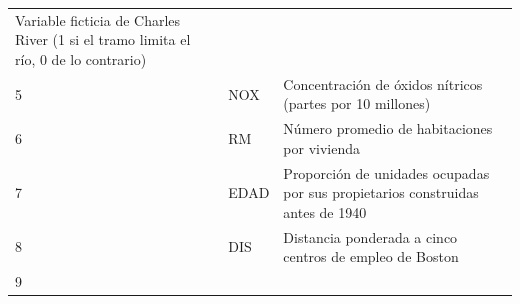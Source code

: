 \documentclass[11pt]{article}
\begin{document}
\begin{longtable}[]{@{}lll@{}}
\begin{minipage}[t]{0.20\columnwidth}
Variable ficticia de Charles River (1 si el tramo limita el río, 0 de lo
contrario)\strut
\end{minipage}\tabularnewline
\begin{minipage}[t]{0.08\columnwidth}\raggedright\strut
5\strut
\end{minipage} & \begin{minipage}[t]{0.14\columnwidth}\raggedright\strut
NOX\strut
\end{minipage} & \begin{minipage}[t]{0.20\columnwidth}\raggedright\strut
Concentración de óxidos nítricos (partes por 10 millones)\strut
\end{minipage}\tabularnewline
\begin{minipage}[t]{0.08\columnwidth}\raggedright\strut
6\strut
\end{minipage} & \begin{minipage}[t]{0.14\columnwidth}\raggedright\strut
RM\strut
\end{minipage} & \begin{minipage}[t]{0.20\columnwidth}\raggedright\strut
Número promedio de habitaciones por vivienda\strut
\end{minipage}\tabularnewline
\begin{minipage}[t]{0.08\columnwidth}\raggedright\strut
7\strut
\end{minipage} & \begin{minipage}[t]{0.14\columnwidth}\raggedright\strut
EDAD\strut
\end{minipage} & \begin{minipage}[t]{0.20\columnwidth}\raggedright\strut
Proporción de unidades ocupadas por sus propietarios construidas antes
de 1940\strut
\end{minipage}\tabularnewline
\begin{minipage}[t]{0.08\columnwidth}\raggedright\strut
8\strut
\end{minipage} & \begin{minipage}[t]{0.14\columnwidth}\raggedright\strut
DIS\strut
\end{minipage} & \begin{minipage}[t]{0.20\columnwidth}\raggedright\strut
Distancia ponderada a cinco centros de empleo de Boston\strut
\end{minipage}\tabularnewline
\begin{minipage}[t]{0.08\columnwidth}\raggedright\strut
9\strut
\end{minipage} & \begin{minipage}[t]{0.14\columnwidth}\raggedright\strut

\end{minipage}
\end{longtable}
\end{document}
